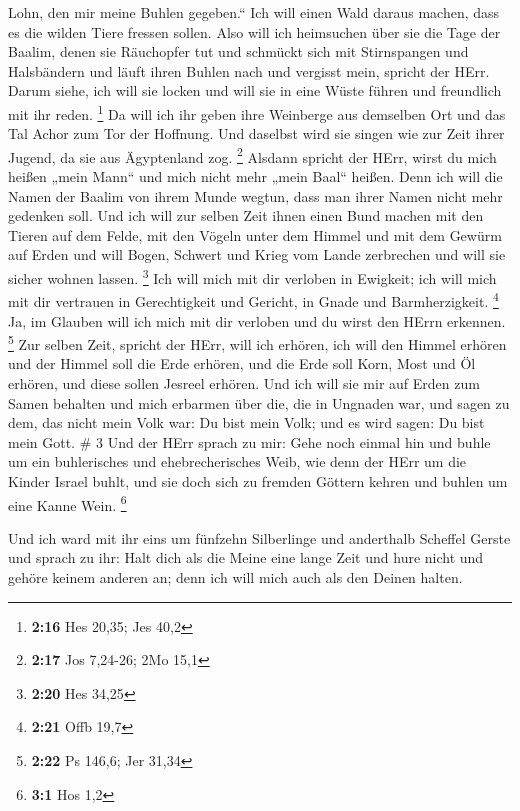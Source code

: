 Lohn, den mir meine Buhlen gegeben.`` Ich will einen Wald daraus machen,
dass es die wilden Tiere fressen sollen.  Also will ich
heimsuchen über sie die Tage der Baalim, denen sie Räuchopfer tut und
schmückt sich mit Stirnspangen und Halsbändern und läuft ihren Buhlen
nach und vergisst mein, spricht der HErr.  Darum siehe, ich
will sie locken und will sie in eine Wüste führen und freundlich mit ihr
reden. \footnote{\textbf{2:16} Hes 20,35; Jes 40,2}  Da
will ich ihr geben ihre Weinberge aus demselben Ort und das Tal Achor
zum Tor der Hoffnung. Und daselbst wird sie singen wie zur Zeit ihrer
Jugend, da sie aus Ägyptenland zog. \footnote{\textbf{2:17} Jos 7,24-26;
  2Mo 15,1}  Alsdann spricht der HErr, wirst du mich heißen
„mein Mann`` und mich nicht mehr „mein Baal`` heißen.  Denn
ich will die Namen der Baalim von ihrem Munde wegtun, dass man ihrer
Namen nicht mehr gedenken soll.  Und ich will zur selben
Zeit ihnen einen Bund machen mit den Tieren auf dem Felde, mit den
Vögeln unter dem Himmel und mit dem Gewürm auf Erden und will Bogen,
Schwert und Krieg vom Lande zerbrechen und will sie sicher wohnen
lassen. \footnote{\textbf{2:20} Hes 34,25}  Ich will mich
mit dir verloben in Ewigkeit; ich will mich mit dir vertrauen in
Gerechtigkeit und Gericht, in Gnade und Barmherzigkeit. \footnote{\textbf{2:21}
  Offb 19,7}  Ja, im Glauben will ich mich mit dir verloben
und du wirst den HErrn erkennen. \footnote{\textbf{2:22} Ps 146,6; Jer
  31,34}  Zur selben Zeit, spricht der HErr, will ich
erhören, ich will den Himmel erhören und der Himmel soll die Erde
erhören,  und die Erde soll Korn, Most und Öl erhören, und
diese sollen Jesreel erhören.  Und ich will sie mir auf
Erden zum Samen behalten und mich erbarmen über die, die in Ungnaden
war, und sagen zu dem, das nicht mein Volk war: Du bist mein Volk; und
es wird sagen: Du bist mein Gott. \# 3  Und der HErr sprach
zu mir: Gehe noch einmal hin und buhle um ein buhlerisches und
ehebrecherisches Weib, wie denn der HErr um die Kinder Israel buhlt, und
sie doch sich zu fremden Göttern kehren und buhlen um eine Kanne Wein.
\footnote{\textbf{3:1} Hos 1,2}

 Und ich ward mit ihr eins um fünfzehn Silberlinge und
anderthalb Scheffel Gerste  und sprach zu ihr: Halt dich als
die Meine eine lange Zeit und hure nicht und gehöre keinem anderen an;
denn ich will mich auch als den Deinen halten.

